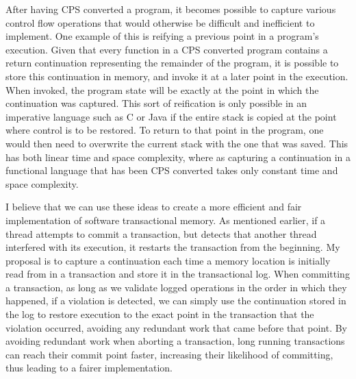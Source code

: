 \documentclass[12pt]{article}
\begin{document}
After having CPS converted a program, it becomes possible to capture various control flow operations that would otherwise be difficult and inefficient to implement.  One example of this is reifying a previous point in a program's execution.  Given that every function in a CPS converted program contains a return continuation representing the remainder of the program, it is possible to store this continuation in memory, and invoke it at a later point in the execution.  When invoked, the program state will be exactly at the point in which the continuation was captured.  This sort of reification is only possible in an imperative language such as C or Java if the entire stack is copied at the point where control is to be restored.  To return to that point in the program, one would then need to overwrite the current stack with the one that was saved.  This has both linear time and space complexity, where as capturing a continuation in a functional language that has been CPS converted takes only constant time and space complexity.

I believe that we can use these ideas to create a more efficient and fair implementation of software transactional memory.  As mentioned earlier, if a thread attempts to commit a transaction, but detects that another thread interfered with its execution, it restarts the transaction from the beginning.  My proposal is to capture a continuation each time a memory location is initially read from in a transaction and store it in the transactional log.  When committing a transaction, as long as we validate logged operations in the order in which they happened, if a violation is detected, we can simply use the continuation stored in the log to restore execution to the exact point in the transaction that the violation occurred, avoiding any redundant work that came before that point.  By avoiding redundant work when aborting a transaction, long running transactions can reach their commit point faster, increasing their likelihood of committing, thus leading to a fairer implementation. 
\end{document}
